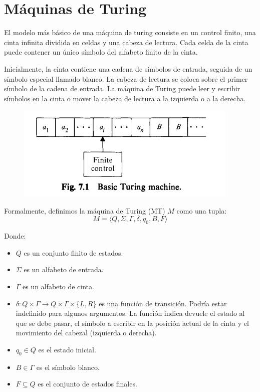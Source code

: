 \section{Máquinas de Turing}
El modelo más básico de una máquina de turing  consiste en un control finito, una cinta infinita dividida en celdas y una cabeza de lectura. Cada celda de la cinta puede contener un único símbolo del alfabeto finito de la cinta.

Inicialmente, la cinta contiene una cadena de símbolos de entrada, seguida de un símbolo especial llamado blanco. La cabeza de lectura se coloca sobre el primer símbolo de la cadena de entrada. La máquina de Turing puede leer y escribir símbolos en la cinta o mover la cabeza de lectura a la izquierda o a la derecha.
\begin{figure}[H]
  \begin{center}
    \includegraphics[scale=0.75]{imagenes/mt.png}
  \end{center}
\end{figure}
Formalmente, definimos la máquina de Turing (MT) \(M\) como una tupla:
\[
  M = \langle Q, \Sigma, \Gamma, \delta, q_0, B, F \rangle
\]

Donde:
\begin{itemize}
  \item \(Q\) es un conjunto finito de estados.
  \item \(\Sigma\) es un alfabeto de entrada.
  \item \(\Gamma\) es un alfabeto de cinta.
  \item \(\delta: Q\times\Gamma\to Q\times\Gamma\times\{L, R\}\) es una función de transición. Podría estar indefinido para algunos argumentos. La función indica devuele el estado al que se debe pasar, el símbolo a escribir en la posición actual de la cinta y el movimiento del cabezal (izquierda o derecha).
  \item \(q_0 \in Q\) es el estado inicial.
  \item \(B \in \Gamma\) es el símbolo blanco.
  \item \(F \subseteq Q\) es el conjunto de estados finales.
\end{itemize}

